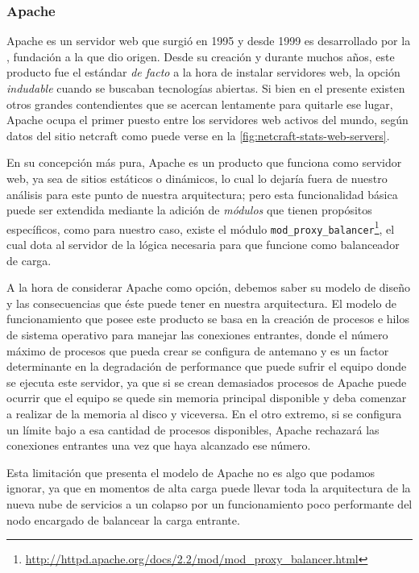 \subsubsection{Apache}
\label{soa:tecnologias:apache}

Apache es un servidor web que surgió en 1995 y desde 1999 es desarrollado por la , fundación a la que dio origen. Desde su creación y durante muchos años, este producto fue el estándar \textit{de facto} a la hora de instalar servidores web, la opción \textit{indudable} cuando se buscaban tecnologías abiertas. Si bien en el presente existen otros grandes contendientes que se acercan lentamente para quitarle ese lugar, Apache ocupa el primer puesto entre los servidores web activos del mundo, según datos del sitio netcraft como puede verse en la \autoref{fig:netcraft-stats-web-servers}.

En su concepción más pura, Apache es un producto que funciona como servidor web, ya sea de sitios estáticos o dinámicos, lo cual lo dejaría fuera de nuestro análisis para este punto de nuestra arquitectura; pero esta funcionalidad básica puede ser extendida mediante la adición de \textit{módulos} que tienen propósitos específicos, como para nuestro caso, existe el módulo \verb|mod_proxy_balancer|\footnote{\url{http://httpd.apache.org/docs/2.2/mod/mod_proxy_balancer.html}}, el cual dota al servidor de la lógica necesaria para que funcione como balanceador de carga.

A la hora de considerar Apache como opción, debemos saber su modelo de diseño y las consecuencias que éste puede tener en nuestra arquitectura. El modelo de funcionamiento que posee este producto se basa en la creación de procesos e hilos de sistema operativo para manejar las conexiones entrantes, donde el número máximo de procesos que pueda crear se configura de antemano y es un factor determinante en la degradación de performance que puede sufrir el equipo donde se ejecuta este servidor, ya que si se crean demasiados procesos de Apache puede ocurrir que el equipo se quede sin memoria principal disponible y deba comenzar a realizar  de la memoria al disco y viceversa. En el otro extremo, si se configura un límite bajo a esa cantidad de procesos disponibles, Apache rechazará las conexiones entrantes una vez que haya alcanzado ese número.

Esta limitación que presenta el modelo de Apache no es algo que podamos ignorar, ya que en momentos de alta carga puede llevar toda la arquitectura de la nueva nube de servicios a un colapso por un funcionamiento poco performante del nodo encargado de balancear la carga entrante.
